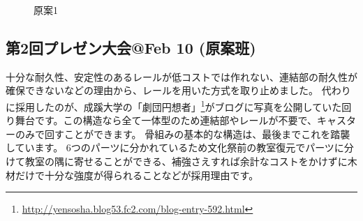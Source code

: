 \documentclass{jsarticle}
\begin{document}
\begin{figure}[htbp]
    \centering
    \caption{原案1}
    \label{figs:原案1}
\end{figure}

\clearpage

\subsection{第2回プレゼン大会@Feb 10 (原案班)}

十分な耐久性、安定性のあるレールが低コストでは作れない、連結部の耐久性が確保できないなどの理由から、レールを用いた方式を取り止めました。
代わりに採用したのが、成蹊大学の「劇団円想者」\footnote{\url{http://yensosha.blog53.fc2.com/blog-entry-592.html}}がブログに写真を公開していた回り舞台です。この構造なら全て一体型のため連結部やレールが不要で、キャスターのみで回すことができます。
骨組みの基本的な構造は、最後までこれを踏襲しています。
6つのパーツに分かれているため文化祭前の教室復元でパーツに分けて教室の隅に寄せることができる、補強さえすれば余計なコストをかけずに木材だけで十分な強度が得られることなどが採用理由です。
\\
\end{document}
